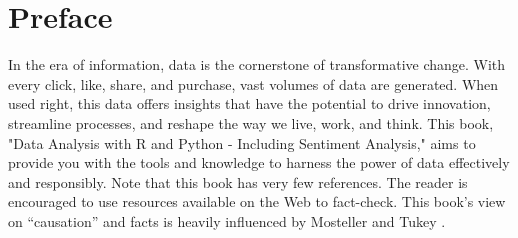 \documentclass[a4paper,12pt]{book}
\begin{document}
\begin{titlepage}
\end{titlepage}


\tableofcontents

\chapter*{Preface}
In the era of information, data is the cornerstone of transformative change. With every click, like, share, and purchase, vast volumes of data are generated. When used right, this data offers insights that have the potential to drive innovation, streamline processes, and reshape the way we live, work, and think. This book, "Data Analysis with R and Python - Including Sentiment Analysis," aims to provide you with the tools and knowledge to harness the power of data effectively and responsibly. Note that this book has very few references. The reader is encouraged to use resources available on the Web to fact-check. This book's view on ``causation'' and facts is heavily influenced by Mosteller and Tukey \parencite{mosteller1977}.
\end{document}
